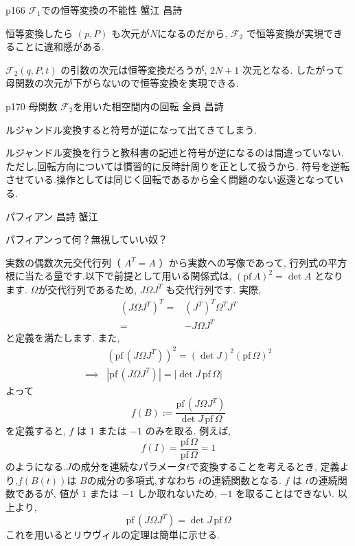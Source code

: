 \documentclass{jlreq}
\newcommand{\qsep}{%
  \tcblower
  \medskip
}
\newcommand{\pf}{\mathrm{pf\,}}
\begin{document}
\begin{qboxok}
  {p166 \( \mathcal{F}_1 \)での恒等変換の不能性 }
  {蟹江}
  {昌詩}

  恒等変換したら \( (p,P) \) も次元が\( N \)になるのだから,
  \( \mathcal{F}_2 \) で恒等変換が実現できることに違和感がある.

  \qsep

  \( \mathcal{F}_2(q,P,t) \) の引数の次元は恒等変換だろうが, \( 2N+1 \) 次元となる.
  したがって母関数の次元が下がらないので恒等変換を実現できる.

\end{qboxok}

\begin{qboxok}
  {p170 母関数 \( \mathcal{F}_2 \)を用いた相空間内の回転}
  {全員}
  {昌詩}

  ルジャンドル変換すると符号が逆になって出てきてしまう.

  \qsep

  ルジャンドル変換を行うと教科書の記述と符号が逆になるのは間違っていない.
  ただし,回転方向については慣習的に反時計周りを正として扱うから.
  符号を逆転させている.操作としては同じく回転であるから全く問題のない返還となっている.

\end{qboxok}

\begin{qboxok}
  {パフィアン}
  {昌詩}
  {蟹江}

  パフィアンって何？無視していい奴？

  \qsep

  実数の偶数次元交代行列（ \( A^{T} = A  \) ）から実数への写像であって,
  行列式の平方根に当たる量です.以下で前提として用いる関係式は, \( (\pf A )^2 = \det A \) となります.
  \( Ω \)が交代行列であるため, \( J Ω J^T \)  も交代行列です.
  実際,
  \begin{align*}
    (J Ω J^T)^T 
    =& (J^T)^T Ω^T J^T\\
    =& -J Ω J^T
  \end{align*}
  と定義を満たします.
  また,
  \begin{align*}
    &\left( \pf (J Ω J^T) \right)^2 = (\det J)^2 (\pf Ω)^2 \\
    \implies & |\pf (J Ω J^T)|= |\det J \, \pf Ω|
  \end{align*}
  よって
  \[f(B):= \frac{\pf (J Ω J^T)}{\det J \, \pf Ω} \]
  を定義すると, \( f \) は \( 1 \) または \( -1 \) のみを取る.
  例えば,
  \[f(I) = \frac{\pf Ω}{\pf Ω} = 1\] 
  のようになる.\( J \)の成分を連続なパラメータ\( t \)で変換することを考えるとき,
  定義より,\( f(B(t)) \)は 
  \( B \)の成分の多項式,すなわち \( t \)の連続関数となる.
  \( f \) は  \( t \)の連続関数であるが, 値が  \( 1 \) または \( -1 \) しか取れないため,
  \( -1 \) を取ることはできない.
  以上より,
  \[\pf (J Ω J^T)= \det J \, \pf Ω\]
  これを用いるとリウヴィルの定理は簡単に示せる.
  
\end{qboxok}
\end{document}
